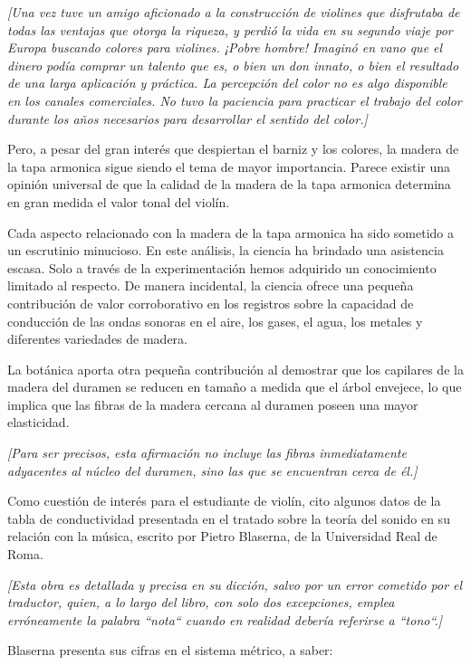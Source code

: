 \documentclass[12pt]{book}
\begin{document}
\textit{[Una vez tuve un amigo aficionado a la construcción de violines que disfrutaba de todas las ventajas que otorga la riqueza, y perdió la vida en su segundo viaje por Europa buscando colores para violines. ¡Pobre hombre! Imaginó en vano que el dinero podía comprar un talento que es, o bien un don innato, o bien el resultado de una larga aplicación y práctica. La percepción del color no es algo disponible en los canales comerciales. No tuvo la paciencia para practicar el trabajo del color durante los años necesarios para desarrollar el sentido del color.]}

Pero, a pesar del gran interés que despiertan el barniz y los colores, la madera de la tapa armonica sigue siendo el tema de mayor importancia. Parece existir una opinión universal de que la calidad de la madera de la tapa armonica determina en gran medida el valor tonal del violín.

Cada aspecto relacionado con la madera de la tapa armonica ha sido sometido a un escrutinio minucioso. En este análisis, la ciencia ha brindado una asistencia escasa. Solo a través de la experimentación hemos adquirido un conocimiento limitado al respecto. De manera incidental, la ciencia ofrece una pequeña contribución de valor corroborativo en los registros sobre la capacidad de conducción de las ondas sonoras en el aire, los gases, el agua, los metales y diferentes variedades de madera. 

La botánica aporta otra pequeña contribución al demostrar que los capilares de la madera del duramen se reducen en tamaño a medida que el árbol envejece, lo que implica que las fibras de la madera cercana al duramen poseen una mayor elasticidad.

\textit{[Para ser precisos, esta afirmación no incluye las fibras inmediatamente adyacentes al núcleo del duramen, sino las que se encuentran cerca de él.]}

Como cuestión de interés para el estudiante de violín, cito algunos datos de la tabla de conductividad presentada en el tratado sobre la teoría del sonido en su relación con la música, escrito por Pietro Blaserna, de la Universidad Real de Roma.

\textit{[Esta obra es detallada y precisa en su dicción, salvo por un error cometido por el traductor, quien, a lo largo del libro, con solo dos excepciones, emplea erróneamente la palabra ``nota`` cuando en realidad debería referirse a ``tono``.]}

Blaserna presenta sus cifras en el sistema métrico, a saber:
\end{document}
